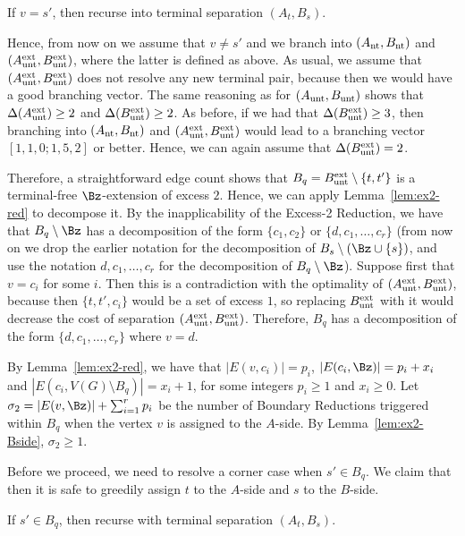\begin{reductionstep}
If $v=s'$, then recurse into terminal separation $(A_t,B_s)$.
\end{reductionstep}

Hence, from now on we assume that $v\neq s'$ and we branch into $(A_{\text{nt}},B_{\text{nt}})$ and $(A_{\text{unt}}^{\text{ext}},B_{\text{unt}}^{\text{ext}})$, where the latter is defined as above. As usual, we assume that $(A_{\text{unt}}^{\text{ext}},B_{\text{unt}}^{\text{ext}})$ does not resolve any new terminal pair, because then we would have a good branching vector. The same reasoning as for $(A_{\text{unt}},B_{\text{unt}})$ shows that $\Delta(A_{\text{unt}}^{\text{ext}})\geq 2$ and $\Delta(B_{\text{unt}}^{\text{ext}})\geq 2$. As before, if we had that $\Delta(B_{\text{unt}}^{\text{ext}})\geq 3$, then branching into $(A_{\text{nt}},B_{\text{nt}})$ and $(A_{\text{unt}}^{\text{ext}},B_{\text{unt}}^{\text{ext}})$ would lead to a branching vector $[1,1,0;1,5,2]$ or better. Hence, we can again assume that $\Delta(B_{\text{unt}}^{\text{ext}})=2$.

Therefore, a straightforward edge count shows that $B_q=B_{\text{unt}}^{\text{ext}}\setminus \{t,t'\}$ is a terminal-free $\Bz$-extension of excess $2$. Hence, we can apply Lemma~\ref{lem:ex2-red} to decompose it. By the inapplicability of the Excess-2 Reduction, we have that $B_q\setminus \Bz$ has a decomposition of the form $\{c_1,c_2\}$ or $\{d,c_1,\ldots,c_r\}$ (from now on we drop the earlier notation for the decomposition of $B_s\setminus (\Bz\cup \{s\})$, and use the notation $d,c_1,\ldots,c_r$ for the decomposition of $B_q\setminus \Bz$). Suppose first that $v=c_i$ for some $i$. Then this is a contradiction with the optimality of $(A_{\text{unt}}^{\text{ext}},B_{\text{unt}}^{\text{ext}})$, because then $\{t,t',c_i\}$ would be a set of excess $1$, so replacing $B_{\text{unt}}^{\text{ext}}$ with it would decrease the cost of separation $(A_{\text{unt}}^{\text{ext}},B_{\text{unt}}^{\text{ext}})$. Therefore, $B_q$ has a decomposition of the form $\{d,c_1,\ldots,c_r\}$ where $v=d$. 

By Lemma~\ref{lem:ex2-red}, we have that $|E(v,c_i)|=p_i$, $|E(c_i,\Bz)|=p_i+x_i$ and $|E(c_i,V(G)\setminus B_q)|=x_i+1$, for some integers $p_i\geq 1$ and $x_i\geq 0$. Let $\sigma_2=|E(v,\Bz)|+\sum_{i=1}^r p_i$ be the number of Boundary Reductions triggered within $B_q$ when the vertex $v$ is assigned to the $A$-side. By Lemma~\ref{lem:ex2-Bside}, $\sigma_2\geq 1$.

Before we proceed, we need to resolve a corner case when $s'\in B_q$. We claim that then it is safe to greedily assign $t$ to the $A$-side and $s$ to the $B$-side.

\begin{reductionstep}\label{rdstep:corner2}
If $s'\in B_q$, then recurse with terminal separation $(A_t,B_s)$.
\end{reductionstep}

